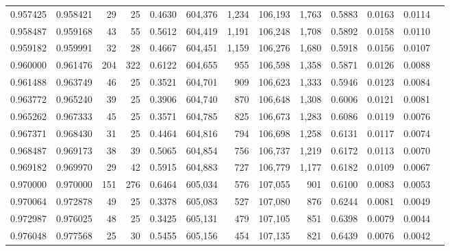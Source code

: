 \begin{tabular}{rrrrrrrrrrrrr}
0.957425 & 0.958421 &    29 &  25 &                                     0.4630 & 604,376 &   1,234 & 106,193 &   1,763 & 0.5883 & 0.0163 & 0.0114 \\
0.958487 & 0.959168 &    43 &  55 &                                     0.5612 & 604,419 &   1,191 & 106,248 &   1,708 & 0.5892 & 0.0158 & 0.0110 \\
0.959182 & 0.959991 &    32 &  28 &                                     0.4667 & 604,451 &   1,159 & 106,276 &   1,680 & 0.5918 & 0.0156 & 0.0107 \\
0.960000 & 0.961476 &   204 & 322 &                                     0.6122 & 604,655 &     955 & 106,598 &   1,358 & 0.5871 & 0.0126 & 0.0088 \\
0.961488 & 0.963749 &    46 &  25 &                                     0.3521 & 604,701 &     909 & 106,623 &   1,333 & 0.5946 & 0.0123 & 0.0084 \\
0.963772 & 0.965240 &    39 &  25 &                                     0.3906 & 604,740 &     870 & 106,648 &   1,308 & 0.6006 & 0.0121 & 0.0081 \\
0.965262 & 0.967333 &    45 &  25 &                                     0.3571 & 604,785 &     825 & 106,673 &   1,283 & 0.6086 & 0.0119 & 0.0076 \\
0.967371 & 0.968430 &    31 &  25 &                                     0.4464 & 604,816 &     794 & 106,698 &   1,258 & 0.6131 & 0.0117 & 0.0074 \\
0.968487 & 0.969173 &    38 &  39 &                                     0.5065 & 604,854 &     756 & 106,737 &   1,219 & 0.6172 & 0.0113 & 0.0070 \\
0.969182 & 0.969970 &    29 &  42 &                                     0.5915 & 604,883 &     727 & 106,779 &   1,177 & 0.6182 & 0.0109 & 0.0067 \\
0.970000 & 0.970000 &   151 & 276 &                                     0.6464 & 605,034 &     576 & 107,055 &     901 & 0.6100 & 0.0083 & 0.0053 \\
0.970064 & 0.972878 &    49 &  25 &                                     0.3378 & 605,083 &     527 & 107,080 &     876 & 0.6244 & 0.0081 & 0.0049 \\
0.972987 & 0.976025 &    48 &  25 &                                     0.3425 & 605,131 &     479 & 107,105 &     851 & 0.6398 & 0.0079 & 0.0044 \\
0.976048 & 0.977568 &    25 &  30 &                                     0.5455 & 605,156 &     454 & 107,135 &     821 & 0.6439 & 0.0076 & 0.0042 \\

\end{tabular}
